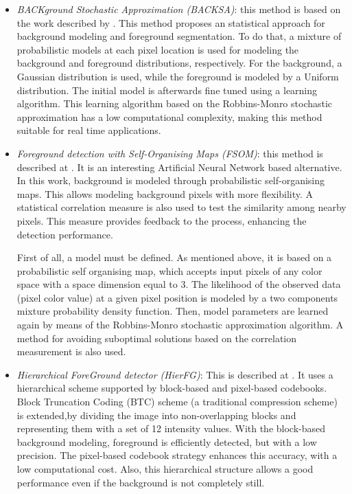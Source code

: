 \begin{itemize}
\item \textit{BACKground Stochastic Approximation (BACKSA)}: this method is based on the work described by 
\cite{lopez2011stochastic}. This method proposes an statistical approach for background modeling and foreground 
segmentation. To do that, a mixture of probabilistic models at each pixel location is used for modeling the background and 
foreground distributions, respectively. For the background, a Gaussian distribution is used, while the foreground is 
modeled by a Uniform distribution. The initial model is afterwards fine tuned using a learning algorithm. This 
learning algorithm based on the Robbins-Monro stochastic approximation has a low computational complexity, making this method suitable for real time applications.
\item \textit{Foreground detection with Self-Organising Maps (FSOM)}: this method is described at 
\cite{lopez2011foreground}. It is an interesting Artificial Neural Network based alternative. In this 
work, background is modeled through probabilistic self-organising maps. This allows modeling background pixels with 
more flexibility. A statistical correlation measure is also used to test the similarity among nearby pixels. This 
measure provides feedback to the process, enhancing the detection performance.

First of all, a model must be defined. As mentioned above, it is based on a probabilistic self organising map, which 
accepts input pixels of any color space with a space dimension equal to 3. The likelihood of the observed data (pixel 
color value) at a given pixel position is modeled by a two components mixture probability density function.
Then, model parameters are learned again by means of the Robbins-Monro stochastic approximation algorithm. A method for avoiding 
suboptimal solutions based on the correlation measurement is also used.
\item \textit{Hierarchical ForeGround detector (HierFG)}: This is described at \cite{guo2011hierarchical}. It uses a 
hierarchical scheme supported by block-based and pixel-based codebooks. Block Truncation Coding (BTC) scheme (a 
traditional compression scheme) is extended,by dividing the image into non-overlapping blocks and representing them with 
a set of 12 intensity values. With the block-based background modeling, foreground is efficiently detected, but with a 
low precision. The pixel-based codebook strategy enhances this accuracy, with a low computational cost. Also, 
this hierarchical structure allows a good performance even if the background is not completely still.


\end{itemize}
